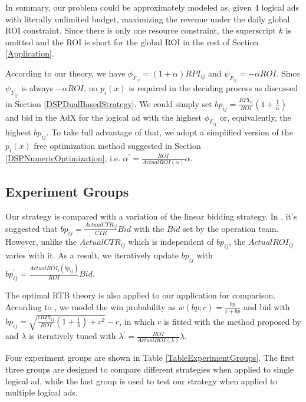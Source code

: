 \documentclass{article}
\newcommand{\sbp}{bp_{ij}}
\newcommand{\sCPI}{RPI_{ij}}
\newcommand{\sF}{F_{ij}}
\newcommand{\pprob}{\phi}
\newcommand{\pcost}{\psi}
\newcommand{\ortbbp}{\sqrt{\frac{c\sCPI}{ROI}(1+\frac{1}{\lambda})+c^2}-c}
\newcommand{\dbbp}{\frac{\sCPI}{ROI}(1+\frac{1}{\alpha})}
\newcommand{\liniter}{\sbp^{'}=\frac{ActualROI_i(\sbp)}{ROI}Bid}
\newcommand{\ortbiter}{\lambda^{'}=\frac{ROI}{ActualROI(\lambda)}\lambda}
\newcommand{\dbiter}{\alpha^{'} = \frac{ROI}{ActualROI(\alpha)}\alpha}
\begin{document}
In summary, our problem could be approximately modeled as, given 4 logical ads with literally unlimited budget,
    maximizing the revenue under the daily global ROI constraint.
Since there is only one resource constraint, the superscript $k$ is omitted and
    the ROI is short for the global ROI in the rest of Section \ref{Application}.

According to our theory, we have $\pprob_{\sF}=(1+\alpha)\sCPI$ and $\pcost_{\sF}=-\alpha{}ROI$.
Since $\pcost_{\sF}$ is always $-\alpha{}ROI$, no $p_i(x)$ is required in the deciding process as discussed in Section \ref{DSPDualBasedStrategy}.
We could simply set $\sbp = \dbbp$ and bid in the AdX for the logical ad
    with the highest $\pprob_{\sF}$ or, equivalently, the highest $\sbp$.
To take full advantage of that, we adopt a simplified version of the $p_i(x)$ free optimization method
    suggested in Section \ref{DSPNumericOptimization}, i.e. $\dbiter$.

\subsection{Experiment Groups}

Our strategy is compared with a variation of the linear bidding strategy.
In \cite{M6D}, it's suggested that $\sbp=\frac{ActualCTR_{ij}}{CTR}Bid$ with the $Bid$ set by the operation team.
However, unlike the $ActualCTR_{ij}$ which is independent of $\sbp$, the $ActualROI_{ij}$ varies with it.
As a result, we iteratively update $\sbp$ with $\liniter$.

The optimal RTB theory is also applied to our application for comparison.
According to \cite{WeinanZhang2014}, we model the win probability as $w(bp;c)=\frac{bp}{c+bp}$ and bid with $\sbp=\ortbbp$,
    in which $c$ is fitted with the method proposed by \cite{Wu2015} and $\lambda$ is iteratively tuned with $\ortbiter$.

Four experiment groups are shown in Table \ref{TableExperimentGroups}.
The first three groups are designed to compare different strategies when applied to single logical ad,
    while the last group is used to test our strategy when applied to multiple logical ads.
\end{document}
